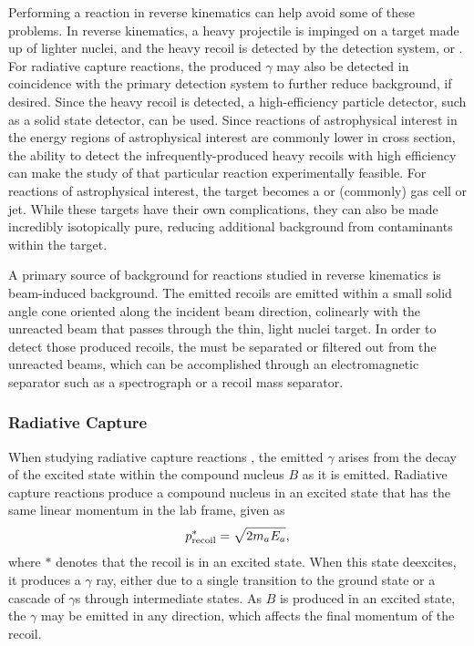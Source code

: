 Performing a reaction in reverse kinematics can help avoid some of these
problems. In reverse kinematics, a heavy projectile is impinged on a target
made up of lighter nuclei, and the heavy recoil is detected by the detection
system, or . For radiative capture reactions, the produced
$\gamma$ may also be detected in coincidence with the primary detection system
to further reduce background, if desired. Since the heavy recoil is detected, a
high-efficiency particle detector, such as a solid state detector, can be used.
Since reactions of astrophysical interest in the energy regions of
astrophysical interest are commonly lower in cross section, the ability to
detect the infrequently-produced heavy recoils with high efficiency can make
the study of that particular reaction experimentally feasible. For reactions of
astrophysical interest, the target becomes a  or 
(commonly) gas cell or jet. While these targets have their own complications,
they can also be made incredibly isotopically pure, reducing additional
background from contaminants within the target.

A primary source of background for reactions studied in reverse kinematics is
beam-induced background. The emitted recoils are emitted within a small solid
angle cone oriented along the incident beam direction, colinearly with the
unreacted beam that passes through the thin, light nuclei target. In order to
detect those produced recoils, the must be separated or filtered out from the
unreacted beams, which can be accomplished through an electromagnetic separator
such as a spectrograph or a recoil mass separator.

\subsubsection{Radiative Capture}


When studying radiative capture reactions , the emitted
$\gamma$ arises from the decay of the excited state within the compound nucleus
$B$ as it is emitted. Radiative capture reactions produce a compound nucleus in
an excited state that
has the same linear momentum in the lab frame, given as
\[
    p^*_{\rm{recoil}} = \sqrt{2m_aE_a},
\]
where $*$ denotes that the recoil is in an excited state. When this state
deexcites, it produces a $\gamma$ ray, either due to a single transition to
the ground state or a cascade of $\gamma$s through intermediate states. As $B$
is produced in an excited state, the $\gamma$ may be emitted in any direction,
which affects the final momentum of the recoil.

